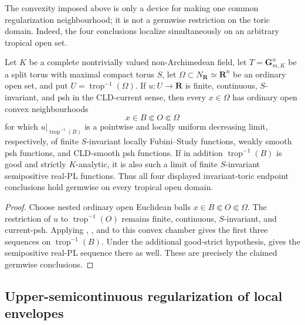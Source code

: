 The convexity imposed above is only a device for making one common
regularization neighbourhood; it is not a germwise restriction on the
toric domain.  Indeed, the four conclusions localize simultaneously on an
arbitrary tropical open set.
\begin{corollary}
\label{cor:p02-invariant-toric-germwise-regularization}
Let \(K\) be a complete nontrivially valued non-Archimedean field, let
\(T=\mathbf G_{m,K}^n\) be a split torus with maximal compact torus \(S\),
let \(\Omega\subset N_{\mathbf R}\simeq\mathbf R^n\) be an ordinary open
set, and put \(U=\operatorname{trop}^{-1}(\Omega)\).  If
\(u:U\to\mathbf R\) is finite, continuous, \(S\)-invariant, and psh in the
CLD-current sense, then every \(x\in\Omega\) has ordinary open convex
neighbourhoods
\[
                  x\in B\Subset O\Subset\Omega
\]
for which \(u|_{\operatorname{trop}^{-1}(B)}\) is a pointwise and locally
uniform decreasing limit, respectively, of finite \(S\)-invariant locally
Fubini--Study functions, weakly smooth psh functions, and CLD-smooth psh
functions.  If in addition \(\operatorname{trop}^{-1}(B)\) is good and
strictly \(K\)-analytic, it is also such a limit of finite \(S\)-invariant
semipositive real-PL functions.
Thus all four displayed invariant-toric endpoint conclusions hold germwise
on every tropical open domain.
\end{corollary}
\begin{proof}
Choose nested ordinary open Euclidean balls
\(x\in B\Subset O\Subset\Omega\).  The restriction of \(u\) to
\(\operatorname{trop}^{-1}(O)\) remains finite, continuous,
\(S\)-invariant, and current-psh.  Applying
,
, and
to this convex chamber gives the first three sequences on
\(\operatorname{trop}^{-1}(B)\).  Under the additional good-strict
hypothesis, 
gives the semipositive real-PL sequence there as well.  These are precisely
the claimed germwise conclusions.
\end{proof}

\subsection{Upper-semicontinuous regularization of local envelopes}
\label{sec:ch72-local-envelope}

